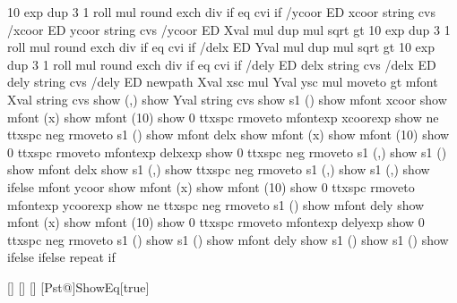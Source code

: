 {{{     { 10 \psk@decimals\space exp dup 3 1 roll mul round exch div } if
     \psk@decimals{} eq {cvi} if /ycoor ED
     xcoor \psk@valuewidth\space string cvs /xcoor ED
     ycoor \psk@valuewidth\space string cvs /ycoor ED
     \psk@relxerr\space Xval mul dup mul sqrt
     \psk@decimals{} gt
     { 10   \psk@decimals\space exp dup 3 1 roll mul round exch div } if
     \psk@decimals{} eq {cvi} if /delx ED
     \psk@relyerr\space Yval mul dup mul sqrt
     \psk@decimals{} gt
     { 10   \psk@decimals\space exp dup 3 1 roll mul round exch div } if
     \psk@decimals{} eq {cvi} if /dely ED
     delx \psk@valuewidth\space string cvs /delx ED
     dely \psk@valuewidth\space string cvs /dely ED
   \fi
%    
     newpath
     Xval xsc mul %
     Yval ysc mul %
     moveto
     \Pst@Debug{} gt {
     mfont
     Xval \psk@valuewidth\space string cvs show (,) show
     Yval \psk@valuewidth\space string cvs show }
     {s1 (\string{}) show 
     mfont xcoor show
       \ifPst@science
       mfont (x) show
       mfont (10) show
       0 ttxspc rmoveto mfontexp xcoorexp show
       \fi
     \psk@relxerr{} ne
     {  ttxspc neg rmoveto s1 (\string{}) show
       mfont delx show
       mfont (x) show
       mfont (10) show
       0 ttxspc rmoveto mfontexp delxexp show
       0 ttxspc neg rmoveto s1 (,) show
       \else
       s1 (\string{}) show
       mfont delx show
       s1 (,) show
       \fi }
     {  ttxspc neg rmoveto s1 (,) show
       \else
       s1 (,) show
       \fi } ifelse
     mfont ycoor show
       \ifPst@science
       mfont (x) show
       mfont (10) show
       0 ttxspc rmoveto mfontexp ycoorexp show
       \fi
     \psk@relyerr{} ne
     {  ttxspc neg rmoveto s1 (\string{}) show
       mfont dely show
       mfont (x) show
       mfont (10) show
       0 ttxspc rmoveto mfontexp delyexp show
       0 ttxspc neg rmoveto s1 (\string{}) show
       \else
       s1 (\string{}) show
       mfont dely show
       s1 (\string{}) show
       \fi }
       { s1 (\string{}) show } ifelse } ifelse
 } repeat } if }

[{}]{\def\psk@EqPos{#1}}
[{}]{\def\psk@MaPos{#1}}%
[{}]{\def\psk@MaScale{#1}}%
[Pst@]{ShowEq}[true]{}%

